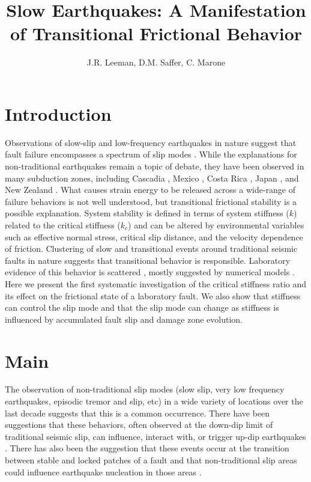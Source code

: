 \documentclass[11pt]{article}
\title{Slow Earthquakes: A Manifestation of Transitional Frictional Behavior}
\author{J.R. Leeman, D.M. Saffer, C. Marone}
\date{} %
\begin{document}
\maketitle

\section{Introduction}
Observations of slow-slip and low-frequency earthquakes in nature suggest that
fault failure encompasses a spectrum of slip modes \cite{Peng:2010, Ide:2007,
Beroza:2011}.  While the explanations for non-traditional earthquakes remain a
topic of debate, they have been observed in many subduction zones, including
Cascadia \cite{Miller:2002, Rogers:2003}, Mexico \cite{Kostoglodov:2003}, Costa
Rica \cite{Jiang:2012}, Japan \cite{Ito:2006}, and New Zealand
\cite{Wallace:2010}. What causes strain energy to be released across a
wide-range of failure behaviors is not well understood, but transitional
frictional stability is a  possible explanation. System stability is defined in
terms of system stiffness ($k$) related to the critical stiffness ($k_{c}$) \cite{Gu:1984} and can be altered by
environmental variables such as effective normal stress, critical slip distance,
and the velocity dependence of friction. Clustering of slow and transitional
events around traditional seismic faults in nature suggests that transitional
behavior is responsible. Laboratory evidence of this behavior is scattered
\cite{Kaproth:2013, Baumberger:1994, Leeman:2015}, mostly suggested by numerical
models \cite{Gu:1984}. Here we present the first systematic investigation of the
critical stiffness ratio and its effect on the frictional state of a laboratory
fault. We also show that stiffness can control the slip mode and that the
slip mode can change as stiffness is influenced by accumulated fault slip and
damage zone evolution.


\section{Main}

The observation of non-traditional slip modes (slow slip, very low frequency
earthquakes, episodic tremor and slip, etc) in a wide variety of locations
over the last decade suggests that this is a common occurrence. There have been
suggestions that these behaviors, often observed at the down-dip limit of
traditional seismic slip, can influence, interact with, or trigger up-dip
earthquakes \cite{Dragert:2001ed,Ide:2007fi}. There has also been the suggestion
that these events occur at the transition between stable and locked patches
of a fault and that non-traditional slip areas could influence earthquake
nucleation in those areas \cite{Linde:1996hn}.
\end{document}
